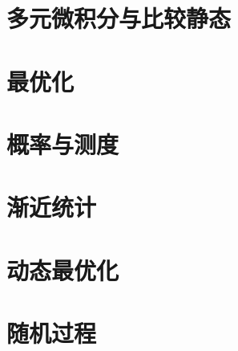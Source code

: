 \documentclass[oneside,fontset=macnew,UTF8]{ctexbook}
\begin{document}
\part{多元微积分与比较静态}






\part{最优化}







\part{概率与测度}







\part{渐近统计}






\part{动态最优化}






\part{随机过程}



\end{document}
